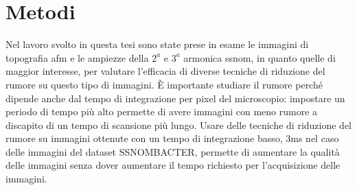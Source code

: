 \documentclass[../main.tex]{subfiles}
\begin{document}
\chapter{Metodi}

Nel lavoro svolto in questa tesi sono state prese in esame le immagini di topografia \acrshort{afm} e le ampiezze della $2^a$ e $3^a$ armonica \acrshort{ssnom}, in quanto quelle di maggior interesse, per valutare l'efficacia di diverse tecniche di riduzione del rumore su questo tipo di immagini. È importante studiare il rumore perché dipende anche dal tempo di integrazione per pixel del microscopio: impostare un periodo di tempo più alto permette di avere immagini con meno rumore a discapito di un tempo di scansione più lungo. Usare delle tecniche di riduzione del rumore su immagini ottenute con un tempo di integrazione basso, $3$ms nel caso delle immagini del dataset SSNOMBACTER, permette di aumentare la qualità delle immagini senza dover aumentare il tempo richiesto per l'acquisizione delle immagini.\cite{baiz_2025} 
\end{document}
